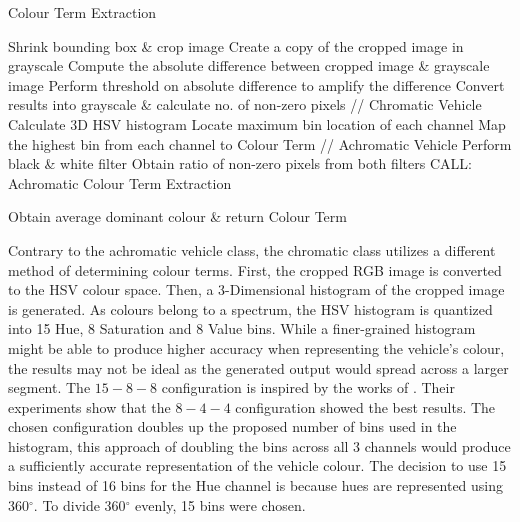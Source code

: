  \begin{algorithm}[!ht]
  \caption{Colour Term Extraction}
  \label{algo:colorExtract}
  \begin{algorithmic}[1]
        \STATE Shrink bounding box \& crop image
        \STATE Create a copy of the cropped image in grayscale
        \STATE Compute the absolute difference between cropped image \& grayscale image
        \STATE Perform threshold on absolute difference to amplify the difference
        \STATE Convert results into grayscale \& calculate no. of non-zero pixels
                \STATE // Chromatic Vehicle
                \STATE Calculate 3D HSV histogram
                \STATE Locate maximum bin location of each channel
                \STATE Map the highest bin from each channel to Colour Term
            \ELSE
                \STATE // Achromatic Vehicle
                \STATE Perform black \& white filter
                \STATE Obtain ratio of non-zero pixels from both filters
                \STATE CALL: Achromatic Colour Term Extraction
            \ENDIF

    \ENDFOR
    \STATE Obtain average dominant colour \& return Colour Term
  \end{algorithmic}
\end{algorithm}

Contrary to the achromatic vehicle class, the chromatic class utilizes a different method of determining colour terms.
First, the cropped RGB image is converted to the HSV colour space. Then, a 3-Dimensional histogram of the cropped image is generated.
As colours belong to a spectrum, the HSV histogram is quantized into 15 Hue, 8 Saturation and 8 Value bins.
While a finer-grained histogram might be able to produce higher accuracy when representing the vehicle's colour, the results may not be ideal as the generated output would spread across a larger segment.
The $15-8-8$ configuration is inspired by the works of \cite{kim2008deciding}. Their experiments show that the $8-4-4$ configuration showed the best results.
The chosen configuration doubles up the proposed number of bins used in the histogram, this approach of doubling the bins across all 3 channels would produce a sufficiently accurate representation of the vehicle colour.
The decision to use 15 bins instead of 16 bins for the Hue channel is because hues are represented using 360$^{\circ}$. To divide 360$^{\circ}$ evenly, 15 bins were chosen.


